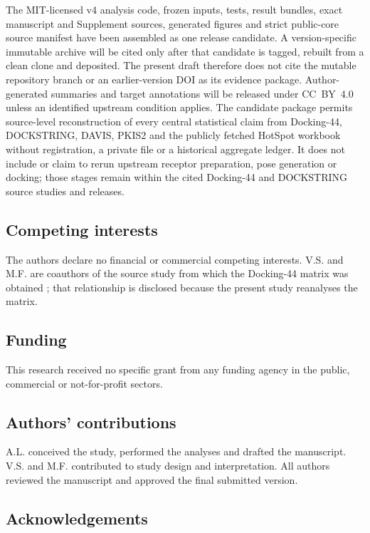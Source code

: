 The MIT-licensed v4 analysis code, frozen inputs, tests, result bundles, exact
manuscript and Supplement sources, generated figures and strict public-core
source manifest have been assembled as one release candidate.  A
version-specific immutable archive will be cited only after that candidate is
tagged, rebuilt from a clean clone and deposited.  The present draft therefore
does not cite the mutable repository branch or an earlier-version DOI as its
evidence package.  Author-generated summaries and target annotations will be
released under CC~BY~4.0 unless an identified upstream condition applies.  The
candidate package permits source-level reconstruction of every central
statistical claim from Docking-44, DOCKSTRING, DAVIS, PKIS2 and the publicly
fetched HotSpot workbook without registration, a private file or a historical
aggregate ledger. It does not include or claim to rerun
upstream receptor preparation, pose generation or docking; those stages remain
within the cited Docking-44 and DOCKSTRING source studies and releases.

\subsection*{Competing interests}

The authors declare no financial or commercial competing interests.  V.S. and
M.F. are coauthors of the source study from which the Docking-44 matrix was
obtained \cite{nikitin2025}; that relationship is disclosed because the present
study reanalyses the matrix.

\subsection*{Funding}

This research received no specific grant from any funding agency in the public,
commercial or not-for-profit sectors.

\subsection*{Authors' contributions}

A.L. conceived the study, performed the analyses and drafted the manuscript.
V.S. and M.F. contributed to study design and interpretation.  All authors
reviewed the manuscript and approved the final submitted version.

\subsection*{Acknowledgements}

